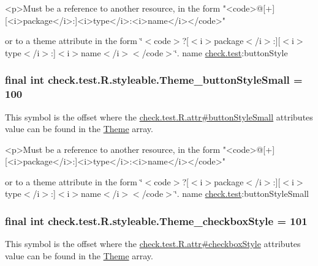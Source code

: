 \begin{DoxyVerb}      <p>Must be a reference to another resource, in the form "<code>@[+][<i>package</i>:]<i>type</i>:<i>name</i></code>"
\end{DoxyVerb}
 or to a theme attribute in the form \char`\"{}$<$code$>$?\mbox{[}$<$i$>$package$<$/i$>$\+:\mbox{]}\mbox{[}$<$i$>$type$<$/i$>$\+:\mbox{]}$<$i$>$name$<$/i$>$$<$/code$>$\char`\"{}.  name \hyperlink{namespacecheck_1_1test}{check.\+test}\+:button\+Style \hypertarget{classcheck_1_1test_1_1_r_1_1styleable_aaaa10bba1d9d98154b1920fc7823a5ed}{}
\subsubsection[{Theme\+\_\+button\+Style\+Small}]{\setlength{\rightskip}{0pt plus 5cm}final int check.\+test.\+R.\+styleable.\+Theme\+\_\+button\+Style\+Small = 100\hspace{0.3cm}{\ttfamily [static]}}\label{classcheck_1_1test_1_1_r_1_1styleable_aaaa10bba1d9d98154b1920fc7823a5ed}
This symbol is the offset where the \hyperlink{classcheck_1_1test_1_1_r_1_1attr_ab3ed13cf9d84ee968fa956ca93671a59}{check.\+test.\+R.\+attr\#button\+Style\+Small} attribute\textquotesingle{}s value can be found in the \hyperlink{classcheck_1_1test_1_1_r_1_1styleable_acca726d02016a0cf607782ec3a436a81}{Theme} array.

\begin{DoxyVerb}      <p>Must be a reference to another resource, in the form "<code>@[+][<i>package</i>:]<i>type</i>:<i>name</i></code>"
\end{DoxyVerb}
 or to a theme attribute in the form \char`\"{}$<$code$>$?\mbox{[}$<$i$>$package$<$/i$>$\+:\mbox{]}\mbox{[}$<$i$>$type$<$/i$>$\+:\mbox{]}$<$i$>$name$<$/i$>$$<$/code$>$\char`\"{}.  name \hyperlink{namespacecheck_1_1test}{check.\+test}\+:button\+Style\+Small \hypertarget{classcheck_1_1test_1_1_r_1_1styleable_a591338acd9ab74487b26ca7193e08bc4}{}
\subsubsection[{Theme\+\_\+checkbox\+Style}]{\setlength{\rightskip}{0pt plus 5cm}final int check.\+test.\+R.\+styleable.\+Theme\+\_\+checkbox\+Style = 101\hspace{0.3cm}{\ttfamily [static]}}\label{classcheck_1_1test_1_1_r_1_1styleable_a591338acd9ab74487b26ca7193e08bc4}
This symbol is the offset where the \hyperlink{classcheck_1_1test_1_1_r_1_1attr_ac810a4b97f13c32171e9d45d5921e8a6}{check.\+test.\+R.\+attr\#checkbox\+Style} attribute\textquotesingle{}s value can be found in the \hyperlink{classcheck_1_1test_1_1_r_1_1styleable_acca726d02016a0cf607782ec3a436a81}{Theme} array.

